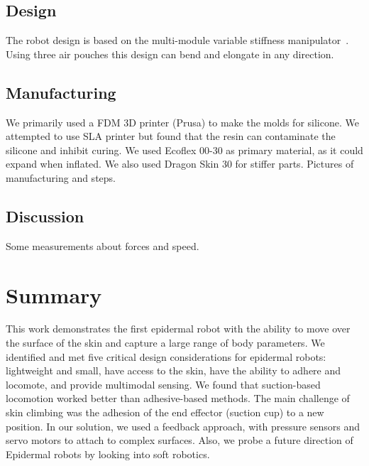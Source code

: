 \subsection{Design}
The robot design is based on the multi-module variable stiffness manipulator~\cite{de2017soft}. Using three air pouches this design can bend and elongate in any direction.  

\subsection{Manufacturing}
We primarily used a FDM 3D printer (Prusa) to make the molds for silicone. We attempted to use SLA printer but found that the resin can contaminate the silicone and inhibit curing. We used Ecoflex 00-30 as primary material, as it could expand when inflated. We also used Dragon Skin 30 for stiffer parts. 
Pictures of manufacturing and steps. 

\subsection{Discussion}
Some measurements about forces and speed. 

\section{Summary}
This work demonstrates the first epidermal robot with the ability to move over the surface of the skin and capture a large range of body parameters. We identified and met five critical design considerations for epidermal robots: lightweight and small, have access to the skin, have the ability to adhere and locomote, and provide multimodal sensing. We found that suction-based locomotion worked better than adhesive-based methods. The main challenge of skin climbing was the adhesion of the end effector (suction cup) to a new position. In our solution, we used a feedback approach, with pressure sensors and servo motors to attach to complex surfaces. Also, we probe a future direction of Epidermal robots by looking into soft robotics.

